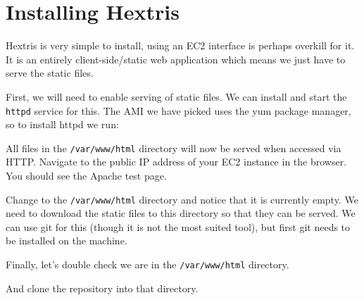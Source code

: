\documentclass{csse4400}
\begin{document}
\section{Installing Hextris}
Hextris is very simple to install, using an EC2 interface is perhaps overkill for it.
It is an entirely client-side/static web application which means we just have to serve the static files.

First, we will need to enable serving of static files.
We can install and start the \texttt{httpd} service for this.
The AMI we have picked uses the yum package manager, so to install httpd we run:


All files in the \texttt{/var/www/html} directory will now be served when accessed via HTTP.
Navigate to the public IP address of your EC2 instance in the browser.
You should see the Apache test page.

Change to the \texttt{/var/www/html} directory and notice that it is currently empty.
We need to download the static files to this directory so that they can be served.
We can use git for this (though it is not the most suited tool),
but first git needs to be installed on the machine.


Finally, let's double check we are in the \texttt{/var/www/html} directory.



And clone the repository into that directory.


\end{document}

